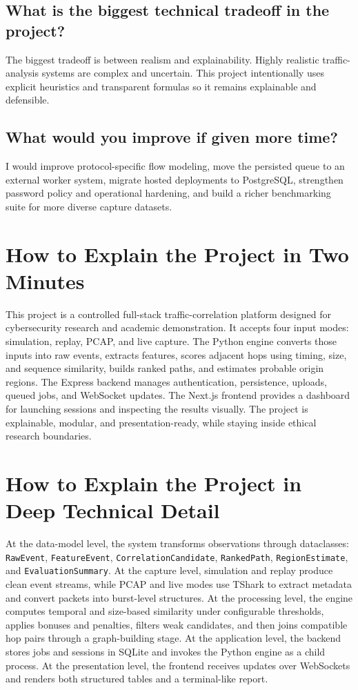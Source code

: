 \documentclass[12pt,a4paper]{report}
\begin{document}
\section{What is the biggest technical tradeoff in the project?}
The biggest tradeoff is between realism and explainability. Highly realistic traffic-analysis systems are complex and uncertain. This project intentionally uses explicit heuristics and transparent formulas so it remains explainable and defensible.

\section{What would you improve if given more time?}
I would improve protocol-specific flow modeling, move the persisted queue to an external worker system, migrate hosted deployments to PostgreSQL, strengthen password policy and operational hardening, and build a richer benchmarking suite for more diverse capture datasets.

\chapter{How to Explain the Project in Two Minutes}
This project is a controlled full-stack traffic-correlation platform designed for cybersecurity research and academic demonstration. It accepts four input modes: simulation, replay, PCAP, and live capture. The Python engine converts those inputs into raw events, extracts features, scores adjacent hops using timing, size, and sequence similarity, builds ranked paths, and estimates probable origin regions. The Express backend manages authentication, persistence, uploads, queued jobs, and WebSocket updates. The Next.js frontend provides a dashboard for launching sessions and inspecting the results visually. The project is explainable, modular, and presentation-ready, while staying inside ethical research boundaries.

\chapter{How to Explain the Project in Deep Technical Detail}
At the data-model level, the system transforms observations through dataclasses: \texttt{RawEvent}, \texttt{FeatureEvent}, \texttt{CorrelationCandidate}, \texttt{RankedPath}, \texttt{RegionEstimate}, and \texttt{EvaluationSummary}. At the capture level, simulation and replay produce clean event streams, while PCAP and live modes use TShark to extract metadata and convert packets into burst-level structures. At the processing level, the engine computes temporal and size-based similarity under configurable thresholds, applies bonuses and penalties, filters weak candidates, and then joins compatible hop pairs through a graph-building stage. At the application level, the backend stores jobs and sessions in SQLite and invokes the Python engine as a child process. At the presentation level, the frontend receives updates over WebSockets and renders both structured tables and a terminal-like report.
\end{document}
